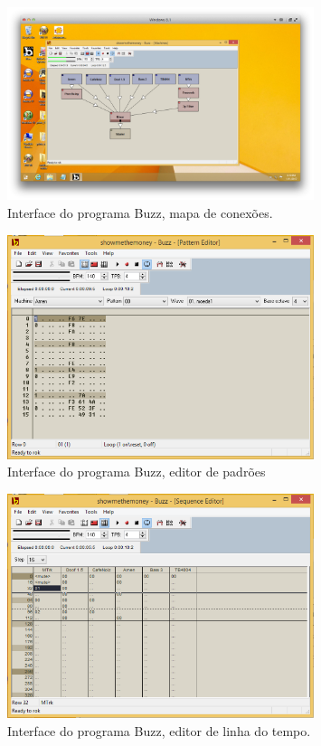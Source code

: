 \begin{figure}

\includegraphics[width=0.8\textwidth]{pictures/cap1/buzz1}
\caption{Interface do programa Buzz, mapa de conexões.}
\label{fig:buzz1}
\end{figure}

\begin{figure}

\includegraphics[width=0.8\textwidth]{pictures/cap1/buzz}
\caption{Interface do programa Buzz, editor de padrões}
\label{fig:buzz}
\end{figure}

\begin{figure}

\includegraphics[width=0.8\textwidth]{pictures/cap1/buzz3}
\caption{Interface do programa Buzz, editor de linha do tempo.}
\label{fig:buzz3}
\end{figure}

